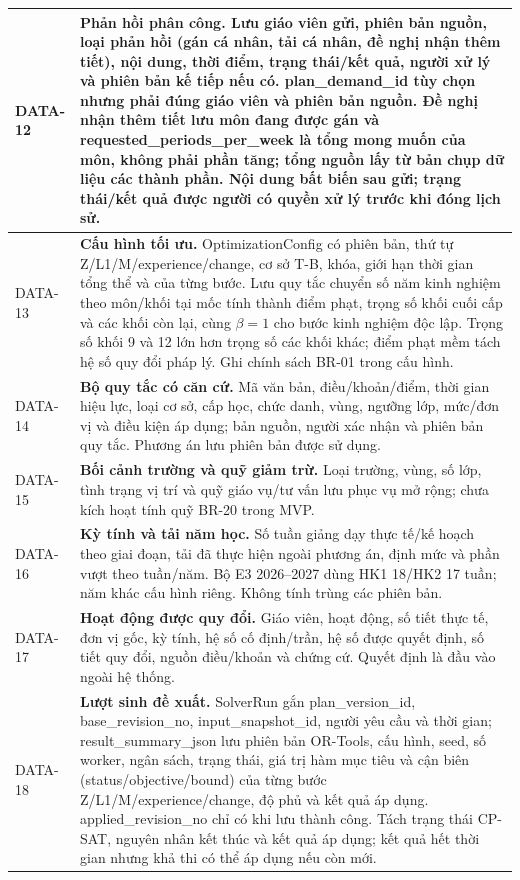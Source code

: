 \documentclass[12pt,a4paper]{report}
\begin{document}
\begin{longtable}{|p{1.45cm}|p{12.5cm}|}
DATA-12 & \textbf{Phản hồi phân công.} Lưu giáo viên gửi, phiên bản nguồn, loại phản hồi (gán cá nhân, tải cá nhân, đề nghị nhận thêm tiết), nội dung, thời điểm, trạng thái/kết quả, người xử lý và phiên bản kế tiếp nếu có. plan\_demand\_id tùy chọn nhưng phải đúng giáo viên và phiên bản nguồn. Đề nghị nhận thêm tiết lưu môn đang được gán và requested\_periods\_per\_week là tổng mong muốn của môn, không phải phần tăng; tổng nguồn lấy từ bản chụp dữ liệu các thành phần. Nội dung bất biến sau gửi; trạng thái/kết quả được người có quyền xử lý trước khi đóng lịch sử. \\\hline
DATA-13 & \textbf{Cấu hình tối ưu.} OptimizationConfig có phiên bản, thứ tự Z/L1/M/experience/change, cơ sở T-B, khóa, giới hạn thời gian tổng thể và của từng bước. Lưu quy tắc chuyển số năm kinh nghiệm theo môn/khối tại mốc tính thành điểm phạt, trọng số khối cuối cấp và các khối còn lại, cùng $\beta=1$ cho bước kinh nghiệm độc lập. Trọng số khối 9 và 12 lớn hơn trọng số các khối khác; điểm phạt mềm tách hệ số quy đổi pháp lý. Ghi chính sách BR-01 trong cấu hình. \\\hline
DATA-14 & \textbf{Bộ quy tắc có căn cứ.} Mã văn bản, điều/khoản/điểm, thời gian hiệu lực, loại cơ sở, cấp học, chức danh, vùng, ngưỡng lớp, mức/đơn vị và điều kiện áp dụng; bản nguồn, người xác nhận và phiên bản quy tắc. Phương án lưu phiên bản được sử dụng. \\\hline
DATA-15 & \textbf{Bối cảnh trường và quỹ giảm trừ.} Loại trường, vùng, số lớp, tình trạng vị trí và quỹ giáo vụ/tư vấn lưu phục vụ mở rộng; chưa kích hoạt tính quỹ BR-20 trong MVP. \\\hline
DATA-16 & \textbf{Kỳ tính và tải năm học.} Số tuần giảng dạy thực tế/kế hoạch theo giai đoạn, tải đã thực hiện ngoài phương án, định mức và phần vượt theo tuần/năm. Bộ E3 2026--2027 dùng HK1 18/HK2 17 tuần; năm khác cấu hình riêng. Không tính trùng các phiên bản.  \\\hline
DATA-17 & \textbf{Hoạt động được quy đổi.} Giáo viên, hoạt động, số tiết thực tế, đơn vị gốc, kỳ tính, hệ số cố định/trần, hệ số được quyết định, số tiết quy đổi, nguồn điều/khoản và chứng cứ. Quyết định là đầu vào ngoài hệ thống.  \\\hline
DATA-18 & \textbf{Lượt sinh đề xuất.} SolverRun gắn plan\_version\_id, base\_revision\_no, input\_snapshot\_id, người yêu cầu và thời gian; result\_summary\_json lưu phiên bản OR-Tools, cấu hình, seed, số worker, ngân sách, trạng thái, giá trị hàm mục tiêu và cận biên (status/objective/bound) của từng bước Z/L1/M/experience/change, độ phủ và kết quả áp dụng. applied\_revision\_no chỉ có khi lưu thành công. Tách trạng thái CP-SAT, nguyên nhân kết thúc và kết quả áp dụng; kết quả hết thời gian nhưng khả thi có thể áp dụng nếu còn mới. \\\hline
\end{longtable}
\end{document}
